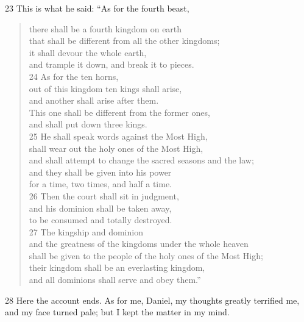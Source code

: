 23 This is what he said: ``As for the fourth beast,

\begin{verse}
there shall be a fourth kingdom on earth \\
          \hspace{1.5em}    that shall be different from all the other kingdoms; \\
it shall devour the whole earth, \\
   \hspace{1.5em}    and trample it down, and break it to pieces. \\
24 As for the ten horns, \\
out of this kingdom ten kings shall arise, \\
    \hspace{1.5em}    and another shall arise after them. \\
This one shall be different from the former ones, \\
     \hspace{1.5em}    and shall put down three kings. \\
25 He shall speak words against the Most High, \\
   \hspace{1.5em}    shall wear out the holy ones of the Most High, \\
   \hspace{1.5em}    and shall attempt to change the sacred seasons and the law; \\
and they shall be given into his power \\
    \hspace{1.5em}    for a time, two times, and half a time. \\
26 Then the court shall sit in judgment, \\
   \hspace{1.5em}    and his dominion shall be taken away, \\
   \hspace{1.5em}    to be consumed and totally destroyed. \\
27 The kingship and dominion \\
   \hspace{1.5em}    and the greatness of the kingdoms under the whole heaven \\
   \hspace{1.5em}    shall be given to the people of the holy ones of the Most High; \\
their kingdom shall be an everlasting kingdom, \\
      \hspace{1.5em}    and all dominions shall serve and obey them.'' \\
\end{verse}

28 Here the account ends. As for me, Daniel, my thoughts greatly terrified me, 
and my face turned pale; but I kept the matter in my mind.
